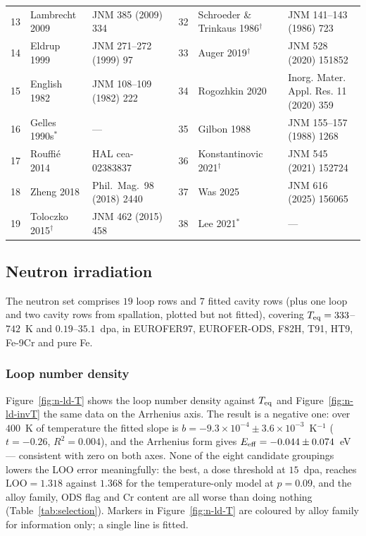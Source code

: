 \begin{table}[htbp]
\begin{tabular}{rllrll}
13 & Lambrecht 2009                & JNM 385 (2009) 334     & 32 & Schroeder \& Trinkaus 1986$^{\dagger}$ & JNM 141--143 (1986) 723 \\
14 & Eldrup 1999                   & JNM 271--272 (1999) 97 & 33 & Auger 2019$^{\dagger}$     & JNM 528 (2020) 151852 \\
15 & English 1982                  & JNM 108--109 (1982) 222& 34 & Rogozhkin 2020             & Inorg. Mater. Appl. Res. 11 (2020) 359 \\
16 & Gelles 1990s$^{*}$            & ---                    & 35 & Gilbon 1988                & JNM 155--157 (1988) 1268 \\
17 & Rouffi\'e 2014                & HAL cea-02383837       & 36 & Konstantinovic 2021$^{\dagger}$ & JNM 545 (2021) 152724 \\
18 & Zheng 2018                    & Phil.\ Mag.\ 98 (2018) 2440 & 37 & Was 2025              & JNM 616 (2025) 156065 \\
19 & Toloczko 2015$^{\dagger}$     & JNM 462 (2015) 458     & 38 & Lee 2021$^{*}$             & --- \\
\bottomrule
\end{tabular}
\end{table}


\subsection{Neutron irradiation}
\label{sec:expdb:neutron}

The neutron set comprises $19$ loop rows and $7$ fitted cavity rows (plus one
loop and two cavity rows from spallation, plotted but not fitted), covering
$T_{\rm eq} = 333$--$742$~K and $0.19$--$35.1$~dpa, in EUROFER97, EUROFER-ODS,
F82H, T91, HT9, Fe-9Cr and pure Fe.

\subsubsection{Loop number density}

Figure~\ref{fig:n-ld-T} shows the loop number density against $T_{\rm eq}$ and
Figure~\ref{fig:n-ld-invT} the same data on the Arrhenius axis. The result is a
negative one: over $400$~K of temperature the fitted slope is
$b = -9.3\times10^{-4} \pm 3.6\times10^{-3}$~K$^{-1}$
($t = -0.26$, $R^{2} = 0.004$), and the Arrhenius form gives
$E_{\rm eff} = -0.044 \pm 0.074$~eV --- consistent with zero on both axes. None
of the eight candidate groupings lowers the LOO error meaningfully: the best,
a dose threshold at $15$~dpa, reaches $\mathrm{LOO} = 1.318$ against $1.368$ for
the temperature-only model at $p = 0.09$, and the alloy family, ODS flag and Cr
content are all worse than doing nothing (Table~\ref{tab:selection}). Markers in
Figure~\ref{fig:n-ld-T} are coloured by alloy family for information only; a
single line is fitted.

